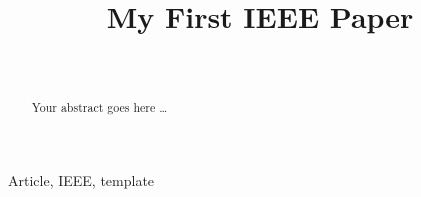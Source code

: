 \documentclass[journal,twocolumn,letterpaper,10pt]{ieee-sty/IEEEtran}
\begin{document}
\newcommand {\GSAuthor} {Graduate~Students}

\def \AuthorA{
    Ziqiang~Cui,~\IEEEmembership{Member,~IEEE,}
    \GSAuthor,
    Huaxiang~Wang,~\IEEEmembership{Senior~Member,~IEEE}%
\thanks{This research is financially supported by NSFC, Nos. 61671319 and 61627803.}%
\thanks{Manuscript received August 19, 2019; revised August 26, 2019.}}







\title{My First IEEE Paper}

\author{\Authors\\
        \Institutions}

\maketitle

\begin{abstract}
Your abstract goes here \ldots
\end{abstract}


\begin{IEEEkeywords}
Article, IEEE, template
\end{IEEEkeywords}







\if{}


\fi
\end{document}
